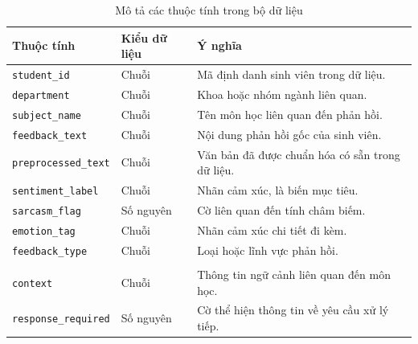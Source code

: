 \begin{table}[H]
    \centering
    \caption{Mô tả các thuộc tính trong bộ dữ liệu}
    \label{tab:mo-ta-thuoc-tinh}
    \renewcommand{\arraystretch}{1.1}
    \setlength{\tabcolsep}{4pt}

    \begin{tabularx}{\textwidth}{
        |p{}
        |p{}
        |X|
    }
        \hline
        \textbf{Thuộc tính}
        & \textbf{Kiểu dữ liệu}
        & \textbf{Ý nghĩa} \\
        \hline

        \texttt{student\_id}
        & Chuỗi
        & Mã định danh sinh viên trong dữ liệu. \\
        \hline

        \texttt{department}
        & Chuỗi
        & Khoa hoặc nhóm ngành liên quan. \\
        \hline

        \texttt{subject\_name}
        & Chuỗi
        & Tên môn học liên quan đến phản hồi. \\
        \hline

        \texttt{feedback\_text}
        & Chuỗi
        & Nội dung phản hồi gốc của sinh viên. \\
        \hline

        \texttt{preprocessed\_text}
        & Chuỗi
        & Văn bản đã được chuẩn hóa có sẵn trong dữ liệu. \\
        \hline

        \texttt{sentiment\_label}
        & Chuỗi
        & Nhãn cảm xúc, là biến mục tiêu. \\
        \hline

        \texttt{sarcasm\_flag}
        & Số nguyên
        & Cờ liên quan đến tính châm biếm. \\
        \hline

        \texttt{emotion\_tag}
        & Chuỗi
        & Nhãn cảm xúc chi tiết đi kèm. \\
        \hline

        \texttt{feedback\_type}
        & Chuỗi
        & Loại hoặc lĩnh vực phản hồi. \\
        \hline

        \shortstack[l]{
            \texttt{subject\_specific\_}\\
            \texttt{context}
        }
        & Chuỗi
        & Thông tin ngữ cảnh liên quan đến môn học. \\
        \hline

        \texttt{response\_required}
        & Số nguyên
        & Cờ thể hiện thông tin về yêu cầu xử lý tiếp. \\
        \hline

    \end{tabularx}
\end{table}

